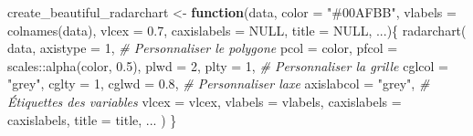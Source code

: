 \documentclass[
]{article}
\newenvironment{Shaded}{\begin{snugshade}}{\end{snugshade}}
\newcommand{\AttributeTok}[1]{\textcolor[rgb]{0.77,0.63,0.00}{#1}}
\newcommand{\CommentTok}[1]{\textcolor[rgb]{0.56,0.35,0.01}{\textit{#1}}}
\newcommand{\ConstantTok}[1]{\textcolor[rgb]{0.00,0.00,0.00}{#1}}
\newcommand{\ControlFlowTok}[1]{\textcolor[rgb]{0.13,0.29,0.53}{\textbf{#1}}}
\newcommand{\DecValTok}[1]{\textcolor[rgb]{0.00,0.00,0.81}{#1}}
\newcommand{\FloatTok}[1]{\textcolor[rgb]{0.00,0.00,0.81}{#1}}
\newcommand{\FunctionTok}[1]{\textcolor[rgb]{0.00,0.00,0.00}{#1}}
\newcommand{\NormalTok}[1]{#1}
\newcommand{\OtherTok}[1]{\textcolor[rgb]{0.56,0.35,0.01}{#1}}
\newcommand{\SpecialCharTok}[1]{\textcolor[rgb]{0.00,0.00,0.00}{#1}}
\newcommand{\StringTok}[1]{\textcolor[rgb]{0.31,0.60,0.02}{#1}}
\begin{document}
\begin{Shaded}
\begin{Highlighting}[]
\NormalTok{create\_beautiful\_radarchart }\OtherTok{\textless{}{-}} \ControlFlowTok{function}\NormalTok{(data, }\AttributeTok{color =} \StringTok{"\#00AFBB"}\NormalTok{, }
                                        \AttributeTok{vlabels =} \FunctionTok{colnames}\NormalTok{(data), }\AttributeTok{vlcex =} \FloatTok{0.7}\NormalTok{,}
                                        \AttributeTok{caxislabels =} \ConstantTok{NULL}\NormalTok{, }\AttributeTok{title =} \ConstantTok{NULL}\NormalTok{, ...)\{}
  \FunctionTok{radarchart}\NormalTok{(}
\NormalTok{    data, }\AttributeTok{axistype =} \DecValTok{1}\NormalTok{,}
    \CommentTok{\# Personnaliser le polygone}
    \AttributeTok{pcol =}\NormalTok{ color, }\AttributeTok{pfcol =}\NormalTok{ scales}\SpecialCharTok{::}\FunctionTok{alpha}\NormalTok{(color, }\FloatTok{0.5}\NormalTok{), }\AttributeTok{plwd =} \DecValTok{2}\NormalTok{, }\AttributeTok{plty =} \DecValTok{1}\NormalTok{,}
    \CommentTok{\# Personnaliser la grille}
    \AttributeTok{cglcol =} \StringTok{"grey"}\NormalTok{, }\AttributeTok{cglty =} \DecValTok{1}\NormalTok{, }\AttributeTok{cglwd =} \FloatTok{0.8}\NormalTok{,}
    \CommentTok{\# Personnaliser l\textquotesingle{}axe}
    \AttributeTok{axislabcol =} \StringTok{"grey"}\NormalTok{, }
    \CommentTok{\# Étiquettes des variables}
    \AttributeTok{vlcex =}\NormalTok{ vlcex, }\AttributeTok{vlabels =}\NormalTok{ vlabels,}
    \AttributeTok{caxislabels =}\NormalTok{ caxislabels, }\AttributeTok{title =}\NormalTok{ title, ...}
\NormalTok{  )}
\NormalTok{\}}
\end{Highlighting}
\end{Shaded}
\end{document}
